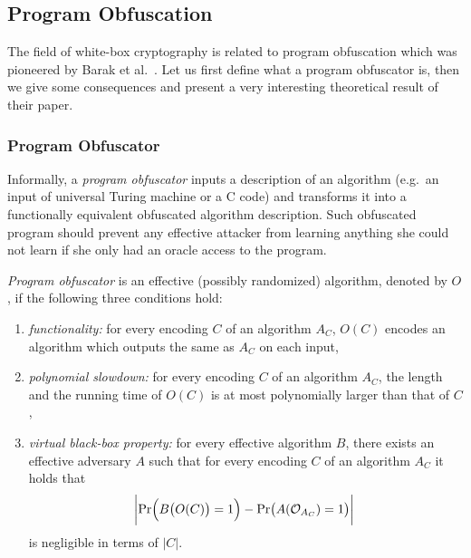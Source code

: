 
\subsection{Program Obfuscation}
\label{sec:impos}

The field of white-box cryptography is related to program obfuscation which was pioneered by Barak et al.\ \cite{barak2001possibility}. Let us first define what a program obfuscator is, then we give some consequences and present a very interesting theoretical result of their paper.

\subsubsection{Program Obfuscator}
	
	Informally, a {\em program obfuscator} inputs a description of an algorithm (e.g.\ an input of universal Turing machine or a C code) and transforms it into a functionally equivalent obfuscated algorithm description. Such obfuscated program should prevent any effective attacker from learning anything she could not learn if she only had an oracle access to the program.
	
	\begin{defn}
	\label{def:obfus}
		{\em Program obfuscator} is an effective (possibly randomized) algorithm, denoted by $O$, if the following three conditions hold:
		\begin{enumerate}
			\item {\em functionality:} for every encoding $C$ of an algorithm $A_C$, $O(C)$ encodes an algorithm which outputs the same as $A_C$ on each input,
			\item {\em polynomial slowdown:} for every encoding $C$ of an algorithm $A_C$, the length and the running time of $O(C)$ is at most polynomially larger than that of $C$,
			\item {\em virtual black-box property:} for every effective algorithm $B$, there exists an effective adversary $A$ such that for every encoding $C$ of an algorithm $A_C$ it holds that
			\[
				\biggl| \Pr\Bigl(B\bigl(O(C)\bigr)=1\Bigr) - \Pr\bigl(A({\cal O}_{A_C})=1\bigr) \biggr| \
			\]
			is negligible in terms of $|C|$.
		\end{enumerate}
	\end{defn}
	
